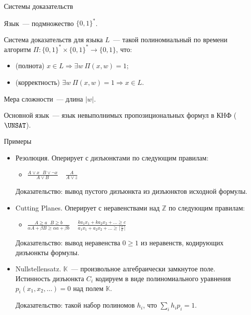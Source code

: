 \begin{frame}{Системы доказательств}

	Язык~--- подмножество $\{0, 1\}^*$.

    \begin{definition}
        Система доказательств для языка $L$~--- такой полиномиальный по времени алгоритм $\Pi: \{0,
        1\}^* \times \{0, 1\}^* \rightarrow \{0, 1\}$, что:
        \begin{itemize}
            \item (полнота) $x \in L \Rightarrow \exists w ~ \Pi(x, w) = 1$;
            \item (корректность) $\exists w ~ \Pi(x, w) = 1 \Rightarrow x \in L$.
        \end{itemize}
    \end{definition}

    \pause

    Мера сложности~--- длина $|w|$.

    \pause

    Основной язык~--- язык невыполнимых пропозициональных формул в КНФ ($\UNSAT$).

\end{frame}


\begin{frame}{Примеры}

    \begin{itemize}
        \item Резолюция.
            \pause
            Оперирует с дизъюнктами по следующим правилам:
            \begin{itemize}
                \item $\frac{A \lor x ~~~ B \lor \neg x}{A \lor B} ~~~~~ \frac{A}{A \lor z}$
            \end{itemize}
            Доказательство: вывод пустого дизъюнкта из дизъюнктов исходной формулы.
        \pause
        \item Cutting Planes.
            \pause
            Оперирует с неравенствами над $\mathbb{Z}$ по следующим правилам:
            \begin{itemize}
                \item $\frac{A \ge a ~~~ B \ge b}{\alpha A + \beta B \ge \alpha a + \beta b} ~~~~~
                    \frac{ka_1 x_1 + ka_2 x_2 + \dots \ge c}{a_1 x_1 + a_2 x_2 + \dots \ge \lceil
                    \frac{c}{k} \rceil}$
            \end{itemize}
            Доказательство: вывод неравенства $0 \ge 1$ из неравенств, кодирующих дизъюнкты формулы.
        \pause
        \item Nullstellensatz.
            \pause
            $\mathbb{K}$~--- произвольное алгебраически замкнутое поле. Истинность дизъюнкта $C_i$
            кодируем в виде полиномиального уравнения $p_i(x_1, x_2, \dots) = 0$ над полем $\mathbb{K}$.
            \pause
            
            Доказательство: такой набор полиномов $h_i$, что $\sum\limits_{i} h_i p_i = 1$.
    \end{itemize}

\end{frame}


